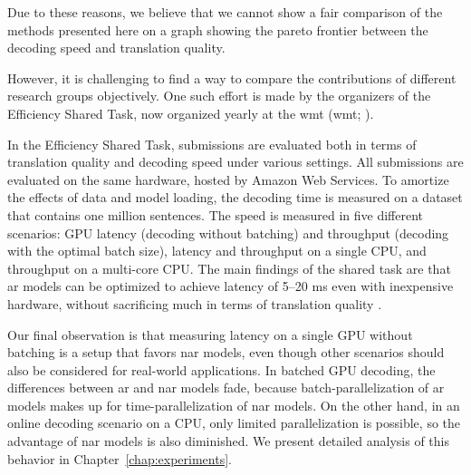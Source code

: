 Due to these reasons, we believe that we cannot show a fair comparison of the
methods presented here on a graph showing the pareto frontier between the
decoding speed and translation quality.

However, it is challenging to find a way to compare the contributions of
different research groups objectively. One such effort is made by the
organizers of the Efficiency Shared Task, now organized yearly at the \acl{wmt}
(\acs{wmt}; \citealp{heafield-etal-2020-findings,
  heafield-etal-2021-findings}).

In the Efficiency Shared Task, submissions are evaluated both in terms of
translation quality and decoding speed under various settings. All submissions
are evaluated on the same hardware, hosted by Amazon Web Services.  To amortize
the effects of data and model loading, the decoding time is measured on a
dataset that contains one million sentences. The speed is measured in five
different scenarios: GPU latency (decoding without batching) and throughput
(decoding with the optimal batch size), latency and throughput on a single CPU,
and throughput on a multi-core CPU. The main findings of the shared task are
that \acl{ar} models can be optimized to achieve latency of 5--20 ms even with
inexpensive hardware, without sacrificing much in terms of translation quality
\citep{heafield-etal-2021-findings}.

Our final observation is that measuring latency on a single GPU without
batching is a setup that favors \ac{nar} models, even though other scenarios
should also be considered for real-world applications. In batched GPU decoding,
the differences between \ac{ar} and \ac{nar} models fade, because
batch-parallelization of \ac{ar} models makes up for time-parallelization of
\ac{nar} models. On the other hand, in an online decoding scenario on a CPU,
only limited parallelization is possible, so the advantage of \ac{nar} models
is also diminished. We present detailed analysis of this behavior in
Chapter~\ref{chap:experiments}.


